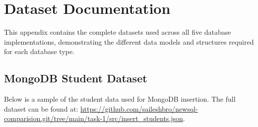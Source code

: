 \chapter{Dataset Documentation}

This appendix contains the complete datasets used across all five database implementations, demonstrating the different data models and structures required for each database type.

\section{MongoDB Student Dataset}

Below is a sample of the student data used for MongoDB insertion. The full dataset can be found at: \url{https://github.com/saileshbro/newsql-comparision.git/tree/main/task-1/src/insert_students.json}.

